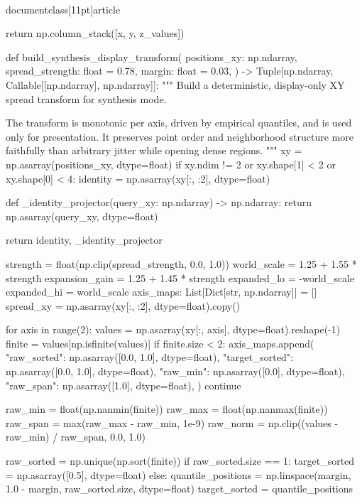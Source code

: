 \\documentclass[11pt]{article}
\begin{document}
\begin{CodeBlock}
    return np.column_stack([x, y, z_values])


def build_synthesis_display_transform(
    positions_xy: np.ndarray,
    spread_strength: float = 0.78,
    margin: float = 0.03,
) -> Tuple[np.ndarray, Callable[[np.ndarray], np.ndarray]]:
    """
    Build a deterministic, display-only XY spread transform for synthesis mode.

    The transform is monotonic per axis, driven by empirical quantiles, and is
    used only for presentation. It preserves point order and neighborhood
    structure more faithfully than arbitrary jitter while opening dense regions.
    """
    xy = np.asarray(positions_xy, dtype=float)
    if xy.ndim != 2 or xy.shape[1] < 2 or xy.shape[0] < 4:
        identity = np.asarray(xy[:, :2], dtype=float)

        def _identity_projector(query_xy: np.ndarray) -> np.ndarray:
            return np.asarray(query_xy, dtype=float)

        return identity, _identity_projector

    strength = float(np.clip(spread_strength, 0.0, 1.0))
    world_scale = 1.25 + 1.55 * strength
    expansion_gain = 1.25 + 1.45 * strength
    expanded_lo = -world_scale
    expanded_hi = world_scale
    axis_maps: List[Dict[str, np.ndarray]] = []
    spread_xy = np.asarray(xy[:, :2], dtype=float).copy()

    for axis in range(2):
        values = np.asarray(xy[:, axis], dtype=float).reshape(-1)
        finite = values[np.isfinite(values)]
        if finite.size < 2:
            axis_maps.append(
                {
                    "raw_sorted": np.asarray([0.0, 1.0], dtype=float),
                    "target_sorted": np.asarray([0.0, 1.0], dtype=float),
                    "raw_min": np.asarray([0.0], dtype=float),
                    "raw_span": np.asarray([1.0], dtype=float),
                }
            )
            continue

        raw_min = float(np.nanmin(finite))
        raw_max = float(np.nanmax(finite))
        raw_span = max(raw_max - raw_min, 1e-9)
        raw_norm = np.clip((values - raw_min) / raw_span, 0.0, 1.0)

        raw_sorted = np.unique(np.sort(finite))
        if raw_sorted.size == 1:
            target_sorted = np.asarray([0.5], dtype=float)
        else:
            quantile_positions = np.linspace(margin, 1.0 - margin, raw_sorted.size, dtype=float)
            target_sorted = quantile_positions


\end{CodeBlock}
\end{document}
